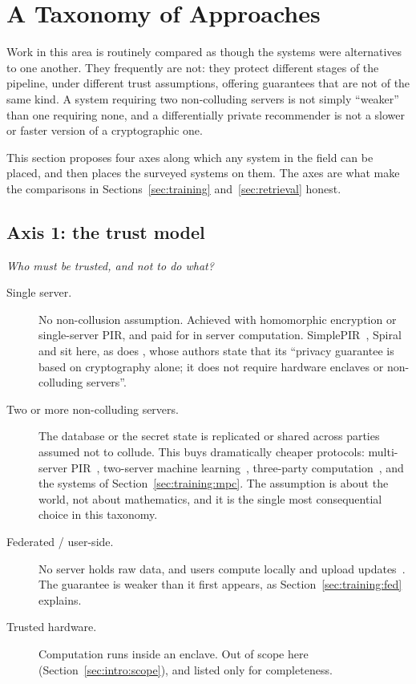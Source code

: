 \section{A Taxonomy of Approaches}
\label{sec:taxonomy}

Work in this area is routinely compared as though the systems were alternatives to one another.
They frequently are not: they protect different stages of the pipeline, under different trust
assumptions, offering guarantees that are not of the same kind. A system requiring two
non-colluding servers is not simply ``weaker'' than one requiring none, and a differentially
private recommender is not a slower or faster version of a cryptographic one.

This section proposes four axes along which any system in the field can be placed, and then places
the surveyed systems on them. The axes are what make the comparisons in
Sections~\ref{sec:training} and~\ref{sec:retrieval} honest.

\subsection{Axis 1: the trust model}
\label{sec:taxonomy:trust}

\emph{Who must be trusted, and not to do what?}

\begin{description}
  \item[Single server.] No non-collusion assumption. Achieved with homomorphic encryption or
        single-server PIR, and paid for in server computation. SimplePIR~\cite{simplepir2023},
        Spiral~\cite{spiral2022} and \panther{} sit here, as does
        \tiptoe{}, whose authors state that its ``privacy guarantee is based on cryptography
        alone; it does not require hardware enclaves or non-colluding servers''.
  \item[Two or more non-colluding servers.] The database or the secret state is replicated or
        shared across parties assumed not to collude. This buys dramatically cheaper protocols:
        multi-server PIR~\cite{chor1995,hafiz2019}, two-server machine
        learning~\cite{secureml2017}, three-party computation~\cite{securenn2019,araki2016}, and
        the systems of Section~\ref{sec:training:mpc}. The assumption is about the world, not
        about mathematics, and it is the single most consequential choice in this taxonomy.
  \item[Federated / user-side.] No server holds raw data, and users compute locally and upload
        updates~\cite{ammadudin2019}. The guarantee is weaker than it first appears, as
        Section~\ref{sec:training:fed} explains.
  \item[Trusted hardware.] Computation runs inside an enclave. Out of scope here
        (Section~\ref{sec:intro:scope}), and listed only for completeness.
\end{description}

